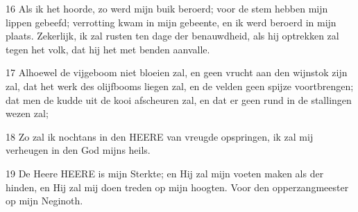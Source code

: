 \par 16 Als ik het hoorde, zo werd mijn buik beroerd; voor de stem hebben mijn lippen gebeefd; verrotting kwam in mijn gebeente, en ik werd beroerd in mijn plaats. Zekerlijk, ik zal rusten ten dage der benauwdheid, als hij optrekken zal tegen het volk, dat hij het met benden aanvalle.
\par 17 Alhoewel de vijgeboom niet bloeien zal, en geen vrucht aan den wijnstok zijn zal, dat het werk des olijfbooms liegen zal, en de velden geen spijze voortbrengen; dat men de kudde uit de kooi afscheuren zal, en dat er geen rund in de stallingen wezen zal;
\par 18 Zo zal ik nochtans in den HEERE van vreugde opspringen, ik zal mij verheugen in den God mijns heils.
\par 19 De Heere HEERE is mijn Sterkte; en Hij zal mijn voeten maken als der hinden, en Hij zal mij doen treden op mijn hoogten. Voor den opperzangmeester op mijn Neginoth.


